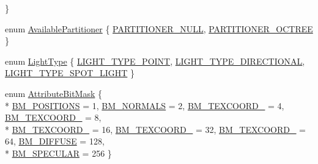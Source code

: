 \begin{DoxyCompactItemize}
 \}
\item 
enum \hyperlink{namespacekglt_a58df2fad6415575cb8217be9174fc922}{Available\-Partitioner} \{ \hyperlink{namespacekglt_a58df2fad6415575cb8217be9174fc922ad93ecc09486bbbb6510fb288408a1f6c}{P\-A\-R\-T\-I\-T\-I\-O\-N\-E\-R\-\_\-\-N\-U\-L\-L}, 
\hyperlink{namespacekglt_a58df2fad6415575cb8217be9174fc922a3322789a83b03b058368e87611d6899b}{P\-A\-R\-T\-I\-T\-I\-O\-N\-E\-R\-\_\-\-O\-C\-T\-R\-E\-E}
 \}
\item 
enum \hyperlink{namespacekglt_a4bc8798d811754c195cce0451b54ac0d}{Light\-Type} \{ \hyperlink{namespacekglt_a4bc8798d811754c195cce0451b54ac0dae51b838e196cdd38dc50e1349612985d}{L\-I\-G\-H\-T\-\_\-\-T\-Y\-P\-E\-\_\-\-P\-O\-I\-N\-T}, 
\hyperlink{namespacekglt_a4bc8798d811754c195cce0451b54ac0dac959c675bbed62a13bb6e74859988fa0}{L\-I\-G\-H\-T\-\_\-\-T\-Y\-P\-E\-\_\-\-D\-I\-R\-E\-C\-T\-I\-O\-N\-A\-L}, 
\hyperlink{namespacekglt_a4bc8798d811754c195cce0451b54ac0dae9a2a9bf057ca6fa15b23414f69eadb1}{L\-I\-G\-H\-T\-\_\-\-T\-Y\-P\-E\-\_\-\-S\-P\-O\-T\-\_\-\-L\-I\-G\-H\-T}
 \}
\item 
enum \hyperlink{namespacekglt_ab0b46153290e015048316308d1cc30f7}{Attribute\-Bit\-Mask} \{ \\*
\hyperlink{namespacekglt_ab0b46153290e015048316308d1cc30f7a744426edeeada955199a1067f3e4a8d1}{B\-M\-\_\-\-P\-O\-S\-I\-T\-I\-O\-N\-S} =  1, 
\hyperlink{namespacekglt_ab0b46153290e015048316308d1cc30f7a119276ee78d994403ff7ce017984318a}{B\-M\-\_\-\-N\-O\-R\-M\-A\-L\-S} =  2, 
\hyperlink{namespacekglt_ab0b46153290e015048316308d1cc30f7a4fe38b5c6fe47542be00e71ce2bc1f65}{B\-M\-\_\-\-T\-E\-X\-C\-O\-O\-R\-D\-\_} =  4, 
\hyperlink{namespacekglt_ab0b46153290e015048316308d1cc30f7acf3d07a3c4cc792db9271ce42db2dd0a}{B\-M\-\_\-\-T\-E\-X\-C\-O\-O\-R\-D\-\_} =  8, 
\\*
\hyperlink{namespacekglt_ab0b46153290e015048316308d1cc30f7a66a5a9826e73e8788ba2d7dd88603579}{B\-M\-\_\-\-T\-E\-X\-C\-O\-O\-R\-D\-\_} =  16, 
\hyperlink{namespacekglt_ab0b46153290e015048316308d1cc30f7afe8105c3dc3e41a0e9b309a6e36c4daf}{B\-M\-\_\-\-T\-E\-X\-C\-O\-O\-R\-D\-\_} =  32, 
\hyperlink{namespacekglt_ab0b46153290e015048316308d1cc30f7a5b85d7c70fe6d0e9e79e4bd6b66e3b72}{B\-M\-\_\-\-T\-E\-X\-C\-O\-O\-R\-D\-\_} =  64, 
\hyperlink{namespacekglt_ab0b46153290e015048316308d1cc30f7a7b63eaf419587cdaff8a9528609dafcc}{B\-M\-\_\-\-D\-I\-F\-F\-U\-S\-E} =  128, 
\\*
\hyperlink{namespacekglt_ab0b46153290e015048316308d1cc30f7ab7155e0cb20b3869f72ba5adf05c27a1}{B\-M\-\_\-\-S\-P\-E\-C\-U\-L\-A\-R} =  256
 \}
\item 

\end{DoxyCompactItemize}
